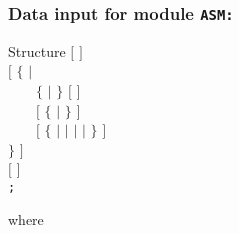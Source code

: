 \subsubsection{Data input for module {\tt ASM:}}\label{sect:descasm}

\begin{DataStructure}{Structure }
$[$   $]$ \\
$[$ $\{$  $|$ \\
~~~~$\{$  $|$  $\}$ $[$  $]$ \\
~~~~$[$ $\{$  $|$  $\}$ $]$ \\
~~~~$[$  $\{$  $|$  $|$  $|$  $|$  $\}$ $]$ \\
$\}$ $]$ \\
$[$  $]$ \\
{\tt ;}
\end{DataStructure}

\noindent
where

